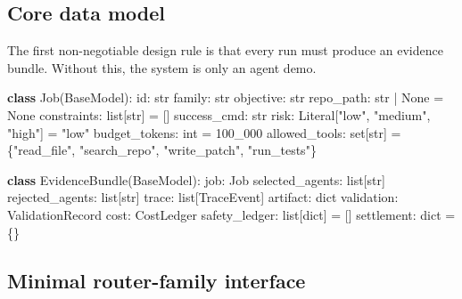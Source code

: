 \documentclass[11pt]{article}
\newenvironment{Shaded}{}{}
\newcommand{\BuiltInTok}[1]{\textcolor[rgb]{0.00,0.50,0.00}{#1}}
\newcommand{\DecValTok}[1]{\textcolor[rgb]{0.25,0.63,0.44}{#1}}
\newcommand{\KeywordTok}[1]{\textcolor[rgb]{0.00,0.44,0.13}{\textbf{#1}}}
\newcommand{\NormalTok}[1]{#1}
\newcommand{\OperatorTok}[1]{\textcolor[rgb]{0.40,0.40,0.40}{#1}}
\newcommand{\StringTok}[1]{\textcolor[rgb]{0.25,0.44,0.63}{#1}}
\newcommand{\VariableTok}[1]{\textcolor[rgb]{0.10,0.09,0.49}{#1}}
\begin{document}
\subsection{Core data model}\label{core-data-model}

The first non-negotiable design rule is that every run must produce an
evidence bundle. Without this, the system is only an agent demo.

\begin{Shaded}
\begin{Highlighting}[]
\KeywordTok{class}\NormalTok{ Job(BaseModel):}
    \BuiltInTok{id}\NormalTok{: }\BuiltInTok{str}
\NormalTok{    family: }\BuiltInTok{str}
\NormalTok{    objective: }\BuiltInTok{str}
\NormalTok{    repo\_path: }\BuiltInTok{str} \OperatorTok{|} \VariableTok{None} \OperatorTok{=} \VariableTok{None}
\NormalTok{    constraints: }\BuiltInTok{list}\NormalTok{[}\BuiltInTok{str}\NormalTok{] }\OperatorTok{=}\NormalTok{ []}
\NormalTok{    success\_cmd: }\BuiltInTok{str}
\NormalTok{    risk: Literal[}\StringTok{"low"}\NormalTok{, }\StringTok{"medium"}\NormalTok{, }\StringTok{"high"}\NormalTok{] }\OperatorTok{=} \StringTok{"low"}
\NormalTok{    budget\_tokens: }\BuiltInTok{int} \OperatorTok{=} \DecValTok{100\_000}
\NormalTok{    allowed\_tools: }\BuiltInTok{set}\NormalTok{[}\BuiltInTok{str}\NormalTok{] }\OperatorTok{=}\NormalTok{ \{}\StringTok{"read\_file"}\NormalTok{, }\StringTok{"search\_repo"}\NormalTok{, }\StringTok{"write\_patch"}\NormalTok{, }\StringTok{"run\_tests"}\NormalTok{\}}

\KeywordTok{class}\NormalTok{ EvidenceBundle(BaseModel):}
\NormalTok{    job: Job}
\NormalTok{    selected\_agents: }\BuiltInTok{list}\NormalTok{[}\BuiltInTok{str}\NormalTok{]}
\NormalTok{    rejected\_agents: }\BuiltInTok{list}\NormalTok{[}\BuiltInTok{str}\NormalTok{]}
\NormalTok{    trace: }\BuiltInTok{list}\NormalTok{[TraceEvent]}
\NormalTok{    artifact: }\BuiltInTok{dict}
\NormalTok{    validation: ValidationRecord}
\NormalTok{    cost: CostLedger}
\NormalTok{    safety\_ledger: }\BuiltInTok{list}\NormalTok{[}\BuiltInTok{dict}\NormalTok{] }\OperatorTok{=}\NormalTok{ []}
\NormalTok{    settlement: }\BuiltInTok{dict} \OperatorTok{=}\NormalTok{ \{\}}
\end{Highlighting}
\end{Shaded}


\subsection{Minimal router-family
interface}\label{minimal-router-family-interface}
\end{document}
